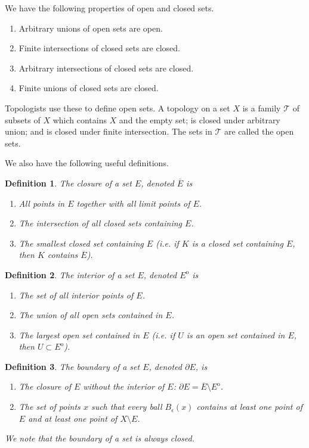 \documentclass[10pt]{article}         %
\newtheorem{definition}{Definition}[section]
\theoremstyle{remark}
\begin{document}
We have the following properties of open and closed sets.

\begin{enumerate}
    \item Arbitrary unions of open sets are open.
    \item Finite intersections of closed sets are closed.
    \item Arbitrary intersections of closed sets are closed.
    \item Finite unions of closed sets are closed.
\end{enumerate}

Topologists use these to define open sets. A topology on a set $X$ is a family $\mathcal{T}$ of subsets of $X$ which contains $X$ and the empty set; is closed under arbitrary union; and is closed under finite intersection. The sets in $\mathcal{T}$ are called the open sets.

We also have the following useful definitions.

\begin{definition}
The \emph{closure} of a set $E$, denoted $\overline{E}$ is
\begin{enumerate}
    \item All points in $E$ together with all limit points of $E$.
    \item The intersection of all closed sets containing $E$.
    \item The smallest closed set containing $E$ (i.e. if $K$ is a closed set containing $E$, then $K$ contains $\overline{E}$).
\end{enumerate}
\end{definition}

\begin{definition}
The \emph{interior} of a set $E$, denoted $E^\mathrm{o}$ is
\begin{enumerate}
    \item The set of all interior points of $E$.
    \item The union of all open sets contained in $E$.
    \item The largest open set contained in $E$ (i.e. if $U$ is an open set contained in $E$, then $U \subset E^\mathrm{o}$).
\end{enumerate}
\end{definition}

\begin{definition}
The \emph{boundary} of a set $E$, denoted $\partial E$, is
\begin{enumerate}
\item The closure of $E$ without the interior of $E$: $\partial E = \overline{E}\setminus E^\mathrm{o}$.
\item The set of points $x$ such that every ball $B_{\epsilon}(x)$ contains at least one point of $E$ and at least one point of $X\setminus E$.
\end{enumerate}

We note that the boundary of a set is always closed.

\end{definition}
\end{document}
